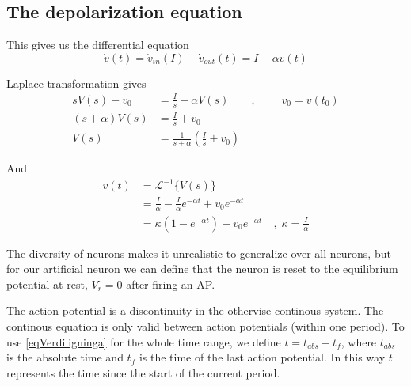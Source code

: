 \subsection{The depolarization equation}%
This gives us the differential equation 
\begin{equation}
	\dot{v}(t) = \dot{v}_{in}(I) - \dot{v}_{out}(t) = I - \alpha v(t)
\end{equation}

Laplace transformation gives
\begin{equation}
	\begin{split}
		sV(s)-v_0 		&= \frac{I}{s} - \alpha V(s) 			\qquad, \; \qquad v_0 = v(t_0) 				\\
		(s+\alpha)V(s) 	&= \frac{I}{s} + v_0 														\\
		V(s) 			&= \frac{1}{s+\alpha}\left( \frac{I}{s} + v_0 \right)
	\end{split}
\end{equation}

And 
\begin{equation}
	\begin{split}
		\label{eqVerdiligninga}
		v(t)  	&= 		\mathscr{L}^{-1}\bigg\{ V(s) \bigg\}  									\\
		 		&=		\frac{I}{\alpha} - \frac{I}{\alpha} e^{-\alpha t} + v_0 e^{-\alpha t} 	\\
				&= 		\kappa \left( 1 - e^{-\alpha t} \right) + v_0 e^{-\alpha t} 	\quad,\; \kappa = \frac{I}{\alpha} 
	\end{split}
\end{equation}

The diversity of neurons makes it unrealistic to generalize over all neurons, but for our artificial neuron we can define 
that the neuron is reset to the equilibrium potential at rest, $V_r = 0$ after firing an AP.

The action potential is a discontinuity in the othervise continous system. The continous equation is only valid between action potentials (within one period).
To use \eqref{eqVerdiligninga} for the whole time range, we define $t = t_{abs}-t_f$, where $t_{abs}$ is the absolute time and $t_f$ is the time of the last action potential. 
In this way $t$ represents the time since the start of the current period.

